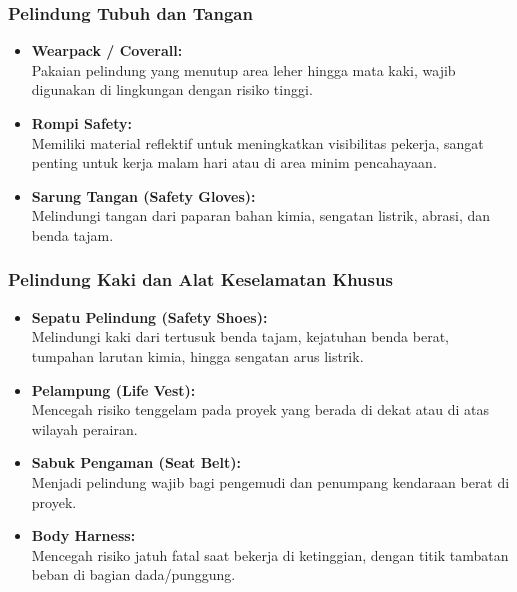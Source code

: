 \documentclass[../main.tex]{subfiles}
\begin{document}
\begin{frame}[t, mytitle=standard]
	\frametitle{Pelindung Tubuh dan Tangan}
	\begin{itemize}
		\item \textbf{Wearpack / Coverall:} \\ Pakaian pelindung yang menutup area leher hingga mata kaki, wajib digunakan di lingkungan dengan risiko tinggi.
		\item \textbf{Rompi Safety:} \\ Memiliki material reflektif untuk meningkatkan visibilitas pekerja, sangat penting untuk kerja malam hari atau di area minim pencahayaan.
		\item \textbf{Sarung Tangan (Safety Gloves):} \\ Melindungi tangan dari paparan bahan kimia, sengatan listrik, abrasi, dan benda tajam.
	\end{itemize}
\end{frame}

\begin{frame}[c, mytitle=center]
	\frametitle{Pelindung Kaki dan Alat Keselamatan Khusus}
	\begin{itemize}
		\item \textbf{Sepatu Pelindung (Safety Shoes):} \\ Melindungi kaki dari tertusuk benda tajam, kejatuhan benda berat, tumpahan larutan kimia, hingga sengatan arus listrik.
		\item \textbf{Pelampung (Life Vest):} \\ Mencegah risiko tenggelam pada proyek yang berada di dekat atau di atas wilayah perairan.
		\item \textbf{Sabuk Pengaman (Seat Belt):} \\ Menjadi pelindung wajib bagi pengemudi dan penumpang kendaraan berat di proyek.
		\item \textbf{Body Harness:} \\ Mencegah risiko jatuh fatal saat bekerja di ketinggian, dengan titik tambatan beban di bagian dada/punggung.
	\end{itemize}
\end{frame}
\end{document}
